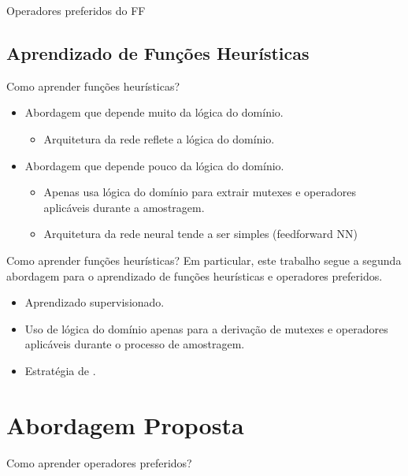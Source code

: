 \documentclass{beamer}
\begin{document}
\begin{frame}{Operadores preferidos do FF}
\end{frame}

\subsection{Aprendizado de Funções Heurísticas}
\begin{frame}{Como aprender funções heurísticas?}
\begin{itemize}
  \item Abordagem que depende \alert{muito} da lógica do domínio.
    \begin{itemize}
      \item Arquitetura da rede reflete a lógica do domínio.
    \end{itemize}
  \pause
  \item Abordagem que depende \alert{pouco} da lógica do domínio.
    \begin{itemize}
      \item Apenas usa lógica do domínio para extrair mutexes e operadores aplicáveis durante a amostragem.
      \item Arquitetura da rede neural tende a ser simples (feedforward NN)
    \end{itemize}
\end{itemize}
\end{frame}

\begin{frame}{Como aprender funções heurísticas?}
Em particular, este trabalho segue a segunda abordagem para o aprendizado de funções heurísticas e operadores preferidos.
\begin{itemize}
  \item Aprendizado supervisionado.
  \item Uso de lógica do domínio apenas para a derivação de mutexes e operadores aplicáveis durante o processo de amostragem.
  \item Estratégia de \cite{Bettker.etal/2022}.
\end{itemize}
\end{frame}


\section{Abordagem Proposta}
\begin{frame}{Como aprender operadores preferidos?}

\end{frame}
\end{document}
